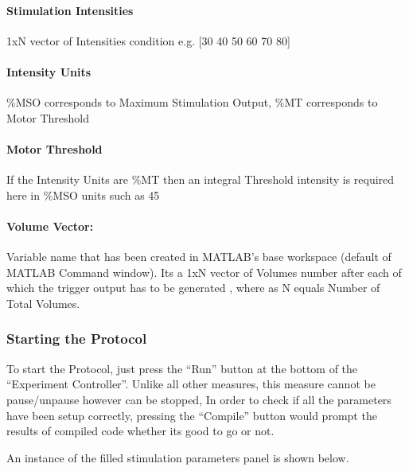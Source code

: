 \documentclass[letterpaper,10pt,english]{sphinxmanual}
\begin{document}
\paragraph{Stimulation Intensities}
\label{\detokenize{14_TMSfMRIMeasurement:stimulation-intensities}}
\sphinxAtStartPar
1xN vector of Intensities condition e.g. {[}30 40 50 60 70 80{]}


\paragraph{Intensity Units}
\label{\detokenize{14_TMSfMRIMeasurement:intensity-units}}
\sphinxAtStartPar
\%MSO corresponds to Maximum Stimulation Output, \%MT corresponds to Motor Threshold


\paragraph{Motor Threshold}
\label{\detokenize{14_TMSfMRIMeasurement:motor-threshold}}
\sphinxAtStartPar
If the Intensity Units are \%MT then an integral Threshold intensity is required here in \%MSO units such as 45


\paragraph{Volume Vector:}
\label{\detokenize{14_TMSfMRIMeasurement:volume-vector}}
\sphinxAtStartPar
Variable name that has been created in MATLAB’s base workspace (default of MATLAB Command window). Its a 1xN vector of Volumes number after each of which the trigger output has to be generated , where as N equals Number of Total Volumes.


\subsubsection{Starting the Protocol}
\label{\detokenize{14_TMSfMRIMeasurement:starting-the-protocol}}
\sphinxAtStartPar
To start the Protocol, just press the “Run” button at the bottom of the “Experiment Controller”. Unlike all other measures, this measure cannot be pause/unpause however can be stopped, In order to check if all the parameters have been setup correctly, pressing the “Compile” button would prompt the results of compiled code whether its good to go or not.

\sphinxAtStartPar
An instance of the filled stimulation parameters panel is shown below.

\begin{figure}[htbp]
\centering

\noindent{}
\end{figure}
\end{document}

